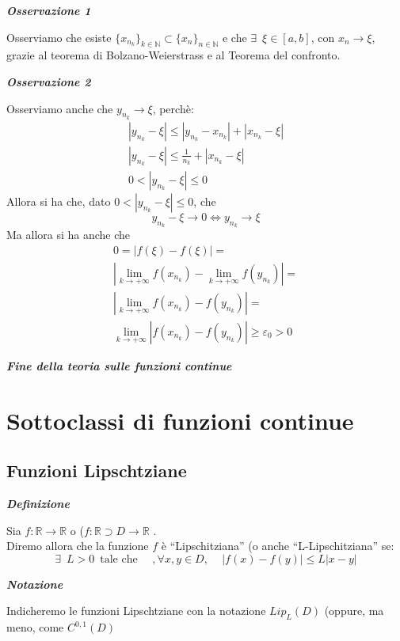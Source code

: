 \documentclass{article}
\theoremstyle{definition}
\newcommand{\virgolette}[1]{``#1''}
\begin{document}
\begin{center}
    \textbf{\textit{Osservazione 1}}
\end{center}
Osserviamo che esiste $\{x_{n_k}\}_{k \in \mathbb{N}} \subset \{x_n\}_{n \in \mathbb{N}}$ e che $\exists \,\,\, \xi \in [a,b]$, con $x_n \to \xi$, grazie al teorema di Bolzano-Weierstrass e al Teorema del confronto.
\begin{center}
    \textbf{\textit{Osservazione 2}}
\end{center}
Osserviamo anche che $y_{n_k} \to \xi$, perchè:
\\
\begin{align*}
    |y_{n_k}-\xi|\leqslant |y_{n_k}-x_{n_k}|+|x_{n_k}-\xi| \\
    |y_{n_k}-\xi| \leqslant \frac{1}{n_k}+|x_{n_k}-\xi| \\
   0< |y_{n_k}-\xi| \leqslant 0
\end{align*}
Allora si ha che, dato $0<|y_{n_k}-\xi| \leqslant 0$, che 
\begin{equation*}
    y_{n_k}-\xi \to 0 \Longleftrightarrow y_{n_k} \to \xi
\end{equation*}
Ma allora si ha anche che 
\begin{align*}
    0=|f(\xi)-f(\xi)|= \\ |\lim_{k \to +\infty}f(x_{n_k})-\lim_{k \to +\infty}f(y_{n_k})|= \\ |\lim_{k \to +\infty}f(x_{n_k})-f(y_{n_k})|= \\ \lim_{k \to +\infty}|f(x_{n_k})-f(y_{n_k})| \geqslant \varepsilon_0>0
\end{align*}
\begin{center}
    \textbf{\textit{Fine della teoria sulle funzioni continue}}
\end{center}
 \newpage
 \section{Sottoclassi di funzioni continue}
\subsection{Funzioni Lipschtziane}
\begin{center}
    \textbf{\textit{Definizione}}
\end{center}
Sia $f: \mathbb{R} \to \mathbb{R}$ o ($f: \mathbb{R} \supset D \to \mathbb{R}$
.\\
Diremo allora che la funzione $f$ è \virgolette{Lipschitziana} (o anche \virgolette{L-Lipschitziana} se:
\\
\begin{equation*}
    \exists \,\,\, L>0 \,\,\, \mbox{tale che}\,\,\,\,\,\,\,\,, \forall x,y \in D,\,\,\,\,\,\,\, |f(x)-f(y)|\leqslant L|x-y|
\end{equation*}
\begin{center}
    \textbf{\textit{Notazione}}
\end{center}
Indicheremo le funzioni Lipschtziane con la notazione ${Lip}_L(D)$ (oppure, ma meno, come $C^{0,1}(D)$
\end{document}
